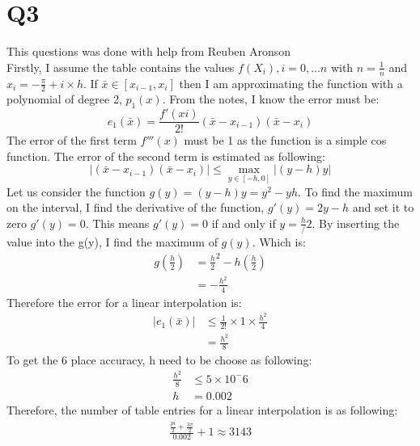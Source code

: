 \documentclass{article}
\begin{document}
\section{Q3}
This questions was done with help from Reuben Aronson\\
Firstly, I assume the table contains the values $f(X_i),i = 0,...n$ with $n=\frac{1}{n}$ and $x_i = -\frac{\pi}{2} + i\times h$.  If $\bar{x} \in [x_{i-1}, x_i]$ then I am approximating the function with a polynomial of degree 2, $p_1(x)$. From the notes, I know the error must be:
\begin{equation*}
e_1(\bar{x}) = \frac{f'(xi)}{2!}(\bar{x} - x_{i-1})(\bar{x} - x_i)
\end{equation*}
The error of the first term $f'''(x)$ must be 1 as the function is a simple cos function. The error of the second term is estimated as following:
\begin{equation*}
|(\bar{x} - x_{i-1})(\bar{x} - x_i)| \leq \max_{y \in [-h, 0]}|(y-h)y|
\end{equation*}
Let us consider the function $g(y) = (y-h)y = y^2 - yh$. To find the maximum on the interval, I find the derivative of the function, $g'(y) = 2y - h$ and set it to zero $g'(y) = 0$. This means $g'(y) = 0$ if and only if $y = \frac{h}/2$. By inserting the value into the g(y), I find the maximum of $g(y)$. Which is:
\begin{equation*}
\begin{aligned}
g(\frac{h}{2}) &= {\frac{h}{2}}^2 - h(\frac{h}{2})\\
	&= -\frac{h^2}{4}
\end{aligned}
\end{equation*}
Therefore the error for a linear interpolation is:
\begin{equation*}
\begin{aligned}
|e_1(\bar{x})| &\leq \frac{1}{2!} \times 1 \times \frac{h^2}{4}\\
&= \frac{h^2}{8}
\end{aligned}
\end{equation*}
To get the 6 place accuracy, h need to be choose as following:
\begin{equation*}
\begin{aligned}
\frac{h^2}{8} &\leq 5 \times 10^-6\\
	h &= 0.002	
\end{aligned}
\end{equation*}
Therefore, the number of table entries for a linear interpolation is as following:
\begin{equation*}
\begin{aligned}
\frac{\frac{pi}{2} + \frac{3\pi}{2}}{0.002} + 1 \approx 3143
\end{aligned}
\end{equation*}
\end{document}
